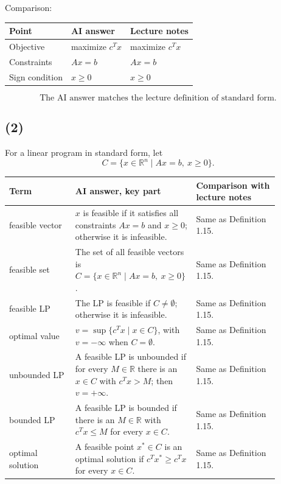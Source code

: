 \documentclass[a4paper,11pt]{article}
\newif\ifexplain
\newcommand{\teil}[1]{\subsection*{(#1)}}
\newcommand{\explain}[1]{\ifexplain\begin{erklbox}#1\end{erklbox}\fi}
\begin{document}
Comparison:
\begin{center}
\begin{tabular}{lll}
\toprule
Point & AI answer & Lecture notes \\
\midrule
Objective & maximize $c^Tx$ & maximize $c^Tx$ \\
Constraints & $Ax=b$ & $Ax=b$ \\
Sign condition & $x\ge0$ & $x\ge0$ \\
\bottomrule
\end{tabular}
\end{center}
\[
\boxed{\text{The AI answer matches the lecture definition of standard form.}}
\]

\teil{2}
For a linear program in standard form, let
\[
C=\{x\in\mathbb R^n\mid Ax=b,\ x\ge0\}.
\]
\explain{Die Menge $C$ sammelt alle Vektoren, die sämtliche Nebenbedingungen erfüllen. Danach können alle Begriffe kurz über $C$ formuliert werden.}

\begin{center}
\begin{tabular}{p{0.24\linewidth}p{0.34\linewidth}p{0.30\linewidth}}
\toprule
Term & AI answer, key part & Comparison with lecture notes \\
\midrule
feasible vector & $x$ is feasible if it satisfies all constraints $Ax=b$ and $x\ge0$; otherwise it is infeasible. & Same as Definition 1.15. \\
feasible set & The set of all feasible vectors is $C=\{x\in\mathbb R^n\mid Ax=b,\ x\ge0\}$. & Same as Definition 1.15. \\
feasible LP & The LP is feasible if $C\neq\emptyset$; otherwise it is infeasible. & Same as Definition 1.15. \\
optimal value & $v=\sup\{c^Tx\mid x\in C\}$, with $v=-\infty$ when $C=\emptyset$. & Same as Definition 1.15. \\
unbounded LP & A feasible LP is unbounded if for every $M\in\mathbb R$ there is an $x\in C$ with $c^Tx>M$; then $v=+\infty$. & Same as Definition 1.15. \\
bounded LP & A feasible LP is bounded if there is an $M\in\mathbb R$ with $c^Tx\le M$ for every $x\in C$. & Same as Definition 1.15. \\
optimal solution & A feasible point $x^*\in C$ is an optimal solution if $c^Tx^*\ge c^Tx$ for every $x\in C$. & Same as Definition 1.15. \\
\bottomrule
\end{tabular}
\end{center}
\explain{Für ein Maximierungsproblem bedeutet ``unbeschränkt'': Der Zielfunktionswert kann beliebig groß werden. ``Beschränkt'' heißt hier nicht, dass die Menge $C$ selbst beschränkt sein muss, sondern dass die Werte $c^Tx$ nach oben durch eine Zahl $M$ begrenzt sind.}
\end{document}

